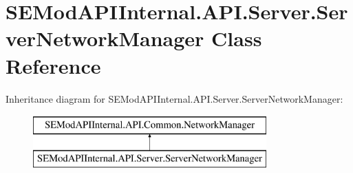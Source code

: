 \hypertarget{class_s_e_mod_a_p_i_internal_1_1_a_p_i_1_1_server_1_1_server_network_manager}{}\section{S\+E\+Mod\+A\+P\+I\+Internal.\+A\+P\+I.\+Server.\+Server\+Network\+Manager Class Reference}
\label{class_s_e_mod_a_p_i_internal_1_1_a_p_i_1_1_server_1_1_server_network_manager}
Inheritance diagram for S\+E\+Mod\+A\+P\+I\+Internal.\+A\+P\+I.\+Server.\+Server\+Network\+Manager\+:\begin{figure}[H]
\begin{center}
\leavevmode
\includegraphics[height=2.000000cm]{class_s_e_mod_a_p_i_internal_1_1_a_p_i_1_1_server_1_1_server_network_manager}
\end{center}
\end{figure}
